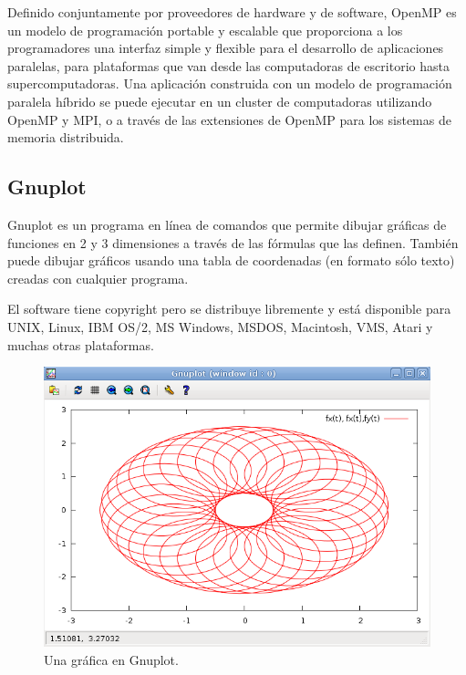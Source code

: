 \documentclass[10pt]{IEEEtran}
\begin{document}
Definido conjuntamente por proveedores de hardware y de software, OpenMP es un modelo de programación portable y escalable que proporciona a los programadores una interfaz simple y flexible para el desarrollo de aplicaciones paralelas, para plataformas que van desde las computadoras de escritorio hasta supercomputadoras. Una aplicación construida con un modelo de programación paralela híbrido se puede ejecutar en un cluster de computadoras utilizando OpenMP y MPI, o a través de las extensiones de OpenMP para los sistemas de memoria distribuida.

\subsection{Gnuplot}
Gnuplot es un programa en línea de comandos que permite dibujar gráficas de funciones en 2 y 3 dimensiones a través de las fórmulas que las definen. También puede dibujar gráficos usando una tabla de coordenadas (en formato sólo texto) creadas con cualquier programa.

El software tiene copyright pero se distribuye libremente y está disponible para UNIX, Linux, IBM OS/2, MS Windows, MSDOS, Macintosh, VMS, Atari y muchas otras plataformas.

\begin{figure}[H]
  \centering
  \includegraphics[width=.9\linewidth]{figs/gnuplot3.png}
  \caption{Una gráfica en Gnuplot.}
  \label{fig:gnuplot}
\end{figure}
\end{document}
